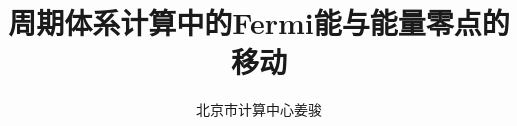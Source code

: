 \documentclass{article}      %
\begin{document}
\graphicspath{{figure/}}
%
\renewcommand{\abstractname}{\small{\CJKfamily{hei} 摘\quad 要}} %
\renewcommand{\refname}{\centering\CJKfamily{hei} 参考文献}
\renewcommand{\figurename}{{\bf Fig}.}
\renewcommand{\tablename}{{\bf Tab}.}

\makeatletter
\long{}
\makeatother

\newcommand{\keywords}[1]{{\hspace{0\ccwd}\small{\CJKfamily{hei} 关键词:}{\hspace{2ex}{#1}}\bigskip}}



\title{周期体系计算中的\textrm{Fermi}能与能量零点的移动}

\author{
\small
北京市计算中心\;\;姜骏
\small
}
\date{}					%
\maketitle
\end{document}
